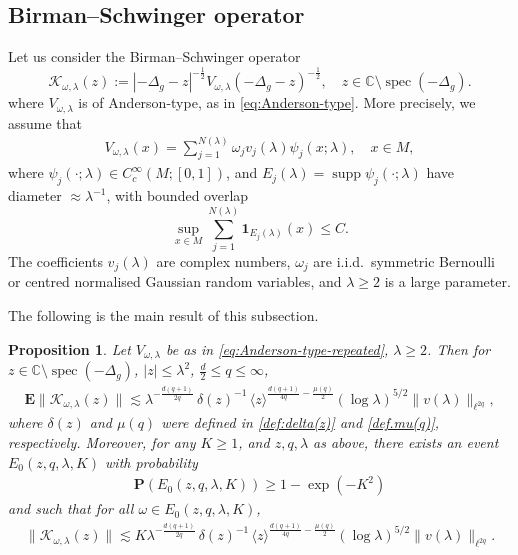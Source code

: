 \documentclass[12pt,reqno]{amsart}
\newtheorem{proposition}[theorem]{Proposition}
\theoremstyle{definition}
\theoremstyle{remark}
\numberwithin{equation}{section}
\newcommand{\1}{\mathbbm{1}}
\newcommand{\C}{\mathbb{C}}
\DeclareMathOperator{\spec}{spec}
\DeclareMathOperator{\supp}{supp}
\begin{document}
\subsection{Birman--Schwinger operator}
Let us consider the Birman--Schwinger operator
\[
  \mathcal{K}_{\omega,\lambda}(z) := |-\Delta_g-z|^{-\frac12} V_{\omega,\lambda} (-\Delta_g-z)^{-\frac12},\quad z\in\C\setminus\spec(-\Delta_g).
\]
where $V_{\omega,\lambda}$ is of Anderson-type, as in \eqref{eq:Anderson-type}. More precisely, we assume that
\begin{align}\label{eq:Anderson-type-repeated}
  V_{\omega,\lambda}(x)
  = \sum_{j=1}^{N(\lambda)} \omega_j v_j(\lambda) \psi_j(x;\lambda),
  \quad x \in M,
\end{align}
where $\psi_j(\cdot;\lambda)\in C_c^{\infty}(M;[0,1])$, and $E_j(\lambda)=\supp \psi_j(\cdot;\lambda)$ have diameter $\approx \lambda^{-1}$, with bounded overlap
  \[  \sup_{x\in M}\sum_{j=1}^{N(\lambda)}\mathbf{1}_{E_j(\lambda)}(x)\leq C.
  \]  
The coefficients $v_j(\lambda)$ are complex numbers, $\omega_j$ are i.i.d.~symmetric Bernoulli or centred normalised Gaussian random variables, and $\lambda\geq 2$ is a large parameter. 


The following is the main result of this subsection.

\begin{proposition}\label{prop:BS_small_q}
  Let $V_{\omega,\lambda}$ be as in \eqref{eq:Anderson-type-repeated}, $\lambda\geq 2$. Then for $z\in\C\setminus\spec(-\Delta_g)$, $|z|\leq \lambda^2$, $\frac{d}{2}\leq q\leq \infty$,
  \begin{align}\label{eq:EnormBSexp}
\mathbf{E}\|\mathcal{K}_{\omega,\lambda}(z)\|
     \lesssim \lambda^{-\frac{d(q+1)}{2q}}\,\delta(z)^{-1}
\,\langle z\rangle^{\frac{d(q+1)}{4q}-\frac{\mu(q)}{2}}
(\log\lambda)^{5/2}\|v(\lambda)\|_{\ell^{2q}},
  \end{align}
where $\delta(z)$ and $\mu(q)$ were defined in \eqref{def:delta(z)} and \eqref{def.mu(q)}, respectively.  
Moreover, for any $K\geq 1$, and $z,q,\lambda$ as above, there exists an event $E_0(z,q,\lambda,K)$ with probability
\begin{align}\label{eq:P(E_0(z,q,lambda,K))}
  \mathbf{P}
  (E_0(z,q,\lambda,K))
  \geq 1-\exp(-K^2)
\end{align}
and such that for all $\omega\in E_0(z,q,\lambda,K)$,
\begin{align}\label{eq:EnormBS}
  \|\mathcal{K}_{\omega,\lambda}(z)\|
  \lesssim K\lambda^{-\frac{d(q+1)}{2q}}\,\delta(z)^{-1}
\,\langle z\rangle^{\frac{d(q+1)}{4q}-\frac{\mu(q)}{2}}
(\log\lambda)^{5/2}\|v(\lambda)\|_{\ell^{2q}}.
\end{align}
\end{proposition}
\end{document}
